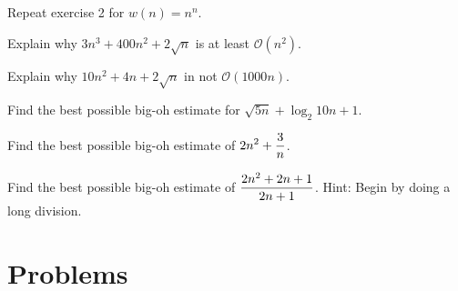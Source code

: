 \begin{exer} 
 Repeat exercise 2 for $w(n) = n^n$.
\end{exer}

\begin{exer} 
 Explain why $3n^3 +400n^2+2\sqrt{n}$ is at least $\mathcal{O}(n^2)$.
\end{exer}

\begin{exer} 
 Explain why $10n^2 +4n+2\sqrt{n}$  in not $\mathcal{O}(1000n)$.
\end{exer}

\begin{exer} 
 Find the best possible big-oh estimate for $\sqrt{5n} + \log_2{10n} +1$.
\end{exer}

\begin{exer} 
 Find the best possible  big-oh estimate of $\displaystyle 2n^2 +{3\over n}$.
\end{exer}

\begin{exer} 
 Find the best possible  big-oh estimate of $\displaystyle {{2n^2+2n+1}\over{2n+1}}$.
Hint: Begin by doing a long division.
\end{exer}

\clearpage

\section{Problems}

